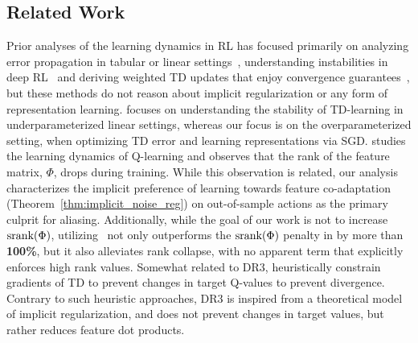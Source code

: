 \vspace{-5pt}
\subsection{Related Work}
\label{sec:related}
\vspace{-5pt}
Prior analyses of the learning dynamics in RL has focused primarily on analyzing error propagation in tabular or linear settings~\citep[\eg][]{chen2019information,duan2020minimax,xie2020q, wang2021what,wang2021instabilities,farahmand2010error,de2002alp}, understanding instabilities in deep RL~\citep{achiam2019towards,bengio2020interference,kumar2020discor,van2018deep} and deriving weighted TD updates that enjoy convergence guarantees~\citep{maei09nonlineargtd,mahmood2015emphatic,sutton16emphatic}, but these methods do not reason about implicit regularization or any form of representation learning. \citet{ghosh2020representations} focuses on understanding the stability of TD-learning in underparameterized linear settings, whereas our focus is on the overparameterized setting, when optimizing TD error and learning representations via SGD.  \citet{kumar2021implicit} studies the learning dynamics of Q-learning and observes that the rank of the feature matrix, $\Phi$, drops during training. While this observation is related, our analysis characterizes the implicit preference of learning towards feature co-adaptation (Theorem~\ref{thm:implicit_noise_reg}) on out-of-sample actions as the primary culprit for aliasing. Additionally, while the goal of our work is not to increase $\text{srank}(\Phi)$, utilizing \methodname\ not only outperforms the $\text{srank}(\Phi)$ penalty in \citet{kumar2021implicit} by more than \textbf{100\%}, but it also alleviates rank collapse, with no apparent term that explicitly enforces high rank values. Somewhat related to DR3, \citet{durugkar2018td,pohlen2018observe} heuristically constrain gradients of TD to prevent changes in target Q-values to prevent divergence. Contrary to such heuristic approaches,  DR3 is inspired from a theoretical model of implicit regularization, and does not prevent changes in target values, but rather reduces feature dot products.

